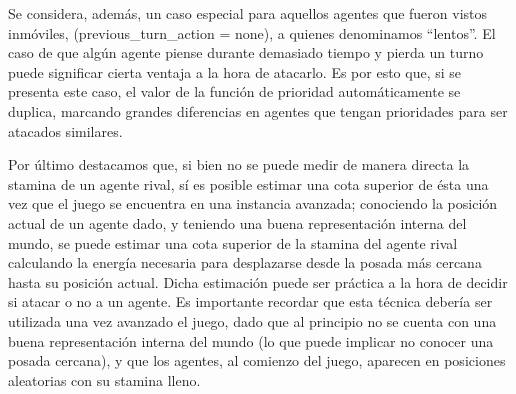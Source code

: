 \documentclass[a4paper,10pt,spanish]{article}
\begin{document}
	Se considera, adem\'as, un caso especial para aquellos agentes que fueron vistos inm\'oviles, (previous\_turn\_action = none), a quienes denominamos ``lentos''. El caso de que alg\'un agente piense durante demasiado tiempo y pierda un turno puede significar cierta ventaja a la hora de atacarlo. Es por esto que, si se presenta este caso, el valor de la funci\'on de prioridad autom\'aticamente se duplica, marcando grandes diferencias en agentes que tengan prioridades para ser atacados similares.		
	
	Por \'ultimo destacamos que, si bien no se puede medir de manera directa la stamina de un agente rival, s\'i es posible estimar una cota superior	de \'esta una vez que el juego se encuentra en una instancia avanzada; conociendo la posici\'on actual de un agente dado, y teniendo una buena representaci\'on interna del mundo, se puede estimar una cota superior de la stamina del agente rival calculando la energ\'ia necesaria para desplazarse desde la posada m\'as cercana hasta su posici\'on actual. Dicha estimaci\'on puede ser pr\'actica a la hora de decidir si atacar o no a un agente. Es importante recordar que esta t\'ecnica deber\'ia ser utilizada una vez avanzado el juego, dado que al principio no se cuenta con una buena representaci\'on interna del mundo (lo que puede implicar no conocer una posada cercana), y que los agentes, al comienzo del juego, aparecen en posiciones aleatorias con su stamina lleno.
	
% 	
	
\end{document}
